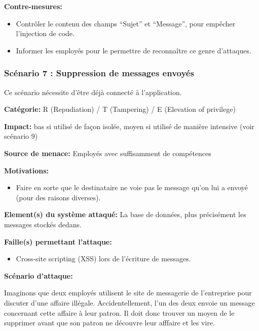 \documentclass{article}
\begin{document}
\textbf{Contre-mesures:}

\begin{itemize}
\tightlist
\item
  Contrôler le contenu des champs ``Sujet'' et ``Message'', pour
  empêcher l'injection de code.
\item
  Informer les employés pour le permettre de reconnaître ce genre
  d'attaques.
\end{itemize}

\hypertarget{scuxe9nario-7-suppression-de-messages-envoyuxe9s}{%
\subsubsection{Scénario 7 : Suppression de messages
envoyés}\label{scuxe9nario-7-suppression-de-messages-envoyuxe9s}}

Ce scénario nécessite d'être déjà connecté à l'application.

\textbf{Catégorie:} R (Repudiation) / T (Tampering) / E (Elevation of
privilege)

\textbf{Impact:} bas si utilisé de façon isolée, moyen si utilisé de
manière intensive (voir scénario 9)

\textbf{Source de menace:} Employés avec suffisamment de compétences

\textbf{Motivations:}

\begin{itemize}
\tightlist
\item
  Faire en sorte que le destinataire ne voie pas le message qu'on lui a
  envoyé (pour des raisons diverses).
\end{itemize}

\textbf{Element(s) du système attaqué:} La base de données, plus
précisément les messages stockés dedans.

\textbf{Faille(s) permettant l'attaque:}

\begin{itemize}
\tightlist
\item
  Cross-site scripting (XSS) lors de l'écriture de messages.
\end{itemize}

\textbf{Scénario d'attaque:}

Imaginons que deux employés utilisent le site de messagerie de
l'entreprise pour discuter d'une affaire illégale. Accidentellement,
l'un des deux envoie un message concernant cette affaire à leur patron.
Il doit donc trouver un moyen de le supprimer avant que son patron ne
découvre leur afffaire et les vire.
\end{document}
